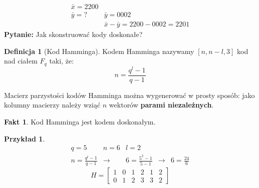 \documentclass[a4paper,12pt]{article}
\theoremstyle{definition}%
\newtheorem{fact}{Fakt} %
\newtheorem{example}{Przykład}
\newtheorem*{example*}{Przykład} %
\theoremstyle{definition}
\newtheorem{definition}{Definicja}%
\theoremstyle{problem}
\begin{document}
\begin{align*}
\bar{x}=2200\\
\bar{y}=? &\bar{y}=0002\\
&\bar{x}-\bar{y}=2200-0002=2201
\end{align*}
\textbf{Pytanie:} Jak skonstruować kody doskonałe?
\begin{definition}[Kod Hamminga]
Kodem Hamminga nazywamy $[n, n-l, 3]$ kod nad ciałem $F_q$ taki, że: $$n=\frac{q^l-1}{q-1}$$

Macierz parzystości kodów Hamminga można wygenerować w prosty sposób: jako kolumny macierzy należy wziąć $n$ wektorów \textbf{parami niezależnych}.
\end{definition}
\begin{fact}
Kod Hamminga jest kodem doskonałym.
\end{fact}
\begin{example*}
\begin{align*}
q=5 & n=6 &l=2 \\
n=\frac{q^l-1}{q-1} & \rightarrow & 6=\frac{5^2-1}{5-1} &\rightarrow &6=\frac{24}{6}
\end{align*}
$$H=\begin{bmatrix}
1&0&1&2&1&2\\0&1&2&3&3&2
\end{bmatrix}$$

\end{example*}


\end{document}
